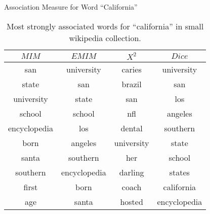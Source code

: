\begin{table}[!htbp]
	\caption{Association Measure for Word ``California''} \label{tab:california}
	\begin{center}
	\vspace{-5mm}
		\begin{tabular}{ c | c | c | c }
			\toprule
			$MIM$ & $EMIM$ & $X^2$ & $Dice$\\
			\midrule
san        &     university  &   caries    &     university    \\
state      &     san         &   brazil    &     san           \\ 
university &     state       &   san       &     los           \\ 
school     &     school      &   nfl       &     angeles       \\ 
encyclopedia &   los         &   dental    &     southern      \\ 
born         &   angeles     &   university &    state         \\ 
santa        &   southern    &   her        &    school        \\ 
southern     &   encyclopedia &  darling    &    states        \\ 
first        &   born         &  coach      &    california    \\ 
age          &   santa        &  hosted     &    encyclopedia  \\ 
			\bottomrule
		\end{tabular}
	\caption*{\scriptsize Most strongly associated words for ``california'' in small wikipedia collection.}
	 \end{center}
\end{table}


